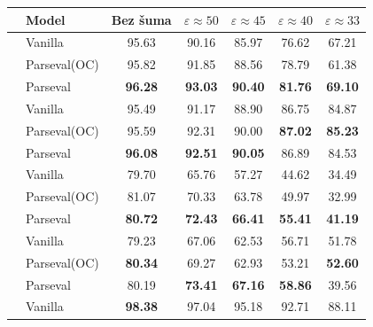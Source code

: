 \documentclass[utf8, seminar, numeric, lmodern]{feri}
\begin{document}
\begin{table}[h!]
	\begin{center}
		\bgroup\footnotesize
		\begin{tabular}{|c|l|c|c|c|c|c|}
			\hline
			{\bf }
			& {\bf Model}
			& {\bf Bez šuma} & {\bf $\varepsilon\approx50$} & {\bf $\varepsilon\approx45$} & {\bf $\varepsilon\approx40$} & {\bf $\varepsilon\approx33$} \\
			\hline
			\multirow{6}{*}{\rotatebox{90}{CIFAR-10}}
			& Vanilla
			& 95.63         & 90.16         & 85.97         & 76.62         & 67.21      \\
			& Parseval(OC)
			& 95.82         & 91.85         & 88.56         & 78.79         & 61.38      \\
			& Parseval
			& \textbf{96.28}          & \textbf{93.03}         & \textbf{90.40}         & \textbf{81.76}         & \textbf{69.10}      \\
			\cline{2-7}
			\cline{2-7}
			& Vanilla
			& 95.49         & 91.17         & 88.90         & 86.75         & 84.87      \\
			& Parseval(OC)
			& 95.59         & 92.31         & 90.00         & \textbf{87.02}         & \textbf{85.23}      \\
			& Parseval
			& \textbf{96.08}          & \textbf{92.51}         & \textbf{90.05}         & 86.89         & 84.53      \\
			\hline\hline
			\multirow{6}{*}{\rotatebox{90}{CIFAR-100}}
			& Vanilla
			& 79.70         & 65.76         & 57.27         & 44.62         & 34.49      \\
			&Parseval(OC)
			& 81.07         & 70.33         & 63.78         & 49.97         & 32.99      \\
			& Parseval
			& \textbf{80.72}          & \textbf{72.43}         & \textbf{66.41}         & \textbf{55.41}         & \textbf{41.19}      \\
			\cline{2-7}
			\cline{2-7}
			& Vanilla
			& 79.23         & 67.06         & 62.53         & 56.71         & 51.78      \\
			& Parseval(OC)
			& \textbf{80.34}         & 69.27         & 62.93         & 53.21         & \textbf{52.60}      \\
			& Parseval
			& 80.19          & \textbf{73.41}         & \textbf{67.16}         & \textbf{58.86}         & 39.56      \\
			\hline\hline
			\multirow{3}{*}{\rotatebox{90}{SVHN}}
			& Vanilla
			& \textbf{98.38}        & 97.04        & 95.18        & 92.71        & 88.11     \\

\end{tabular}
\end{center}
\end{table}
\end{document}
